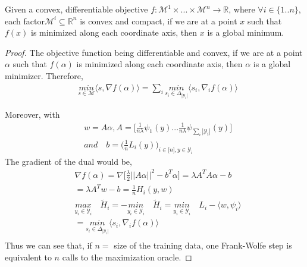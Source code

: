 \begin{theorem} Given a convex, differentiable objective
$f:\mathcal{M}^{1}\times...\times\mathcal{M}^{n}\to\mathbb{R}$, where $\forall
i\in\{1..n\}$, each factor\quad $\mathcal{M}^{i}\subseteq\mathbb{R}^{n}$ is
convex and compact, if we are at a point $x$ such that $f(x)$ is minimized along
each coordinate axis, then $x$ is a global minimum.
\begin{proof}
The objective function being differentiable and convex, if we are at a point
$\alpha$ such that $f(\alpha)$ is minimized along each coordinate axis, then
$\alpha$ is a global minimizer. Therefore,
\begin{align}
    &\underset{s\in\mathcal{M}}{\textit{min}}\langle s, \nabla f(\alpha)\rangle
= \sum_{i}\underset{s_{i}\in\Delta_{|\mathcal{Y}_{i}|}}{\textit{min}}\langle
s_{i}, \nabla_{i} f(\alpha)\rangle
\end{align}

Moreover, with
\begin{align*}
   &w=A\alpha, A=\Big[\frac{1}{n\lambda}\psi_{1}(y)...\frac{1}{n\lambda}\psi_{\sum_{i}|\mathcal{Y}_{i}|}(y)\Big]\\
   &\textit{and}\quad b=\Big(\frac{1}{n}L_{i}(y)\Big)_{i\in\big[n\big],y\in\mathcal{Y}_{i}}
\end{align*}
The gradient of the dual would be,
\begin{align*}
    &\nabla f(\alpha)= \nabla\Big[\frac{\lambda}{2}||A\alpha||^{2}- b^{T}\alpha\Big] = \lambda A^{T}A\alpha- b\\
    &= \lambda A^{T}w- b= \frac{1}{n}H_{i}(y,w)\\
    &\underset{y_{i}\in\mathcal{Y}_{i}}{\textit{max}}\quad\tilde{H}_{i}=
  -\underset{y_{i}\in\mathcal{Y}_{i}}{\textit{min}}\quad\tilde{H}_{i} =
  \underset{y_{i}\in\mathcal{Y}_{i}}{\textit{min}}\quad L_{i}- \langle w,
  \psi_{i}\rangle\\ &=
  \underset{s_{i}\in\Delta_{|\mathcal{Y}_{i}|}}{\textit{min}}\langle s_{i},
  \nabla_{i} f(\alpha)\rangle\\
\end{align*}
Thus we can see that, if $n=$ size of the training data, one Frank-Wolfe step is
equivalent to $n$ calls to the maximization oracle.
\end{proof}
\end{theorem}

